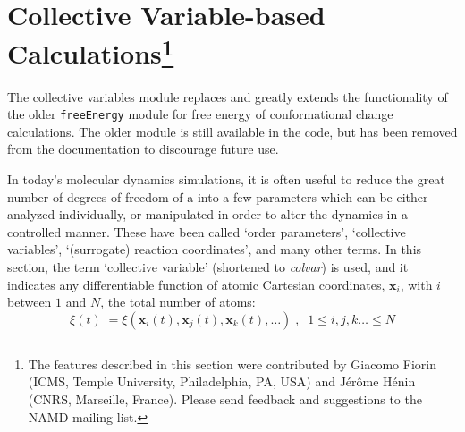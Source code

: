 
\section{Collective Variable-based Calculations\footnote{ The features
described in this section were contributed by Giacomo Fiorin (ICMS,
Temple University, Philadelphia, PA, USA) and J\'er\^ome H\'enin (CNRS,
Marseille, France). Please send feedback and suggestions
to the NAMD mailing list.}}
\label{section:colvars}

The collective variables module replaces and greatly extends the
functionality of the older \texttt{freeEnergy} module for free energy
of conformational change calculations.  The older module is still
available in the code, but has been removed from the documentation to
discourage future use.

In today's molecular dynamics simulations, it is often useful to
reduce the great number of degrees of freedom of a into a few
parameters which can be either analyzed individually, or manipulated
in order to alter the dynamics in a controlled manner.  These have
been called `order parameters', `collective variables', `(surrogate)
reaction coordinates', and many other terms.  In this section, the
term `collective variable' (shortened to \textit{colvar}) is used, and
it indicates any differentiable function of atomic Cartesian
coordinates, $\bm{x}_{i}$, with $i$ between $1$ and $N$, the total
number of atoms:
\begin{equation} 
  \label{eq:colvar_basic}
  \xi(t) \; = \xi\left(\bm{x}_{i}(t), \bm{x}_{j}(t), \bm{x}_{k}(t),
  \ldots \right)\;, \;\; 1 \leq i,j,k\ldots \leq N
\end{equation}

